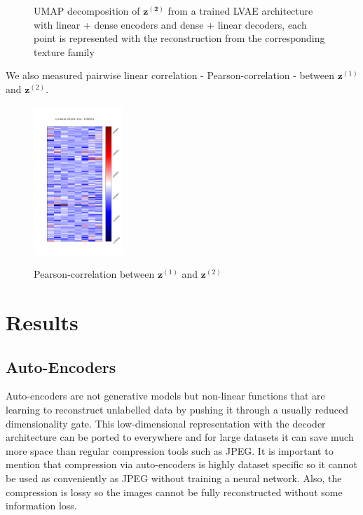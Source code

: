 \documentclass[12pt, english]{article}
\begin{document}
\begin{figure}[H]
\begin{minipage}{0.48\linewidth}
    \caption{UMAP decomposition of $\bm{z^{(2)}}$ from a trained LVAE architecture with linear + dense encoders and dense + linear decoders, each point is represented with the reconstruction from the corresponding texture family} 
    \label{fig:umap-z2-text}
  \end{minipage} 
\end{figure}

\vspace{4mm}

\par We also measured pairwise linear correlation - Pearson-correlation - between $\bm{z}^{(1)}$ and $\bm{z}^{(2)}$.

\vspace{4mm}

\begin{figure}[H]
    \centering
    \includegraphics[width=0.3\textwidth]{z1_z2_correlation.png}
    \label{fig:pearson-matrix}
    \caption{Pearson-correlation between $\bm{z}^{(1)}$ and $\bm{z}^{(2)}$}
\end{figure}

\newpage

\section{Results}

\vspace{7mm}

\subsection{Auto-Encoders}

\vspace{5mm}

\par Auto-encoders are not generative models but non-linear functions that are learning to reconstruct unlabelled data by pushing it through a usually reduced dimensionality gate. This low-dimensional representation with the decoder architecture can be ported to everywhere and for large datasets it can save much more space than regular compression tools such as JPEG. It is important to mention that compression via auto-encoders is highly dataset specific so it cannot be used as conveniently as JPEG without training a neural network. Also, the compression is lossy so the images cannot be fully reconstructed without some information loss.
\end{document}
